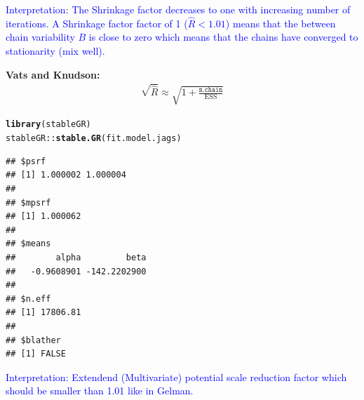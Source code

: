 \documentclass{article}\usepackage[]{graphicx}\usepackage[]{xcolor}
\makeatletter
\newcommand{\hlopt}[1]{\textcolor[rgb]{0,0,0}{#1}}%
\newcommand{\hlstd}[1]{\textcolor[rgb]{0.345,0.345,0.345}{#1}}%
\newcommand{\hlkwd}[1]{\textcolor[rgb]{0.737,0.353,0.396}{\textbf{#1}}}%
\newenvironment{kframe}{%
 \def\at@end@of@kframe{}%
 \ifinner\ifhmode%
  \def\at@end@of@kframe{\end{minipage}}%
  \begin{minipage}{\columnwidth}%
 \fi\fi%
 \def\FrameCommand##1{\hskip\@totalleftmargin \hskip-\fboxsep
 \colorbox{shadecolor}{##1}\hskip-\fboxsep
     \hskip-\linewidth \hskip-\@totalleftmargin \hskip\columnwidth}%
 \MakeFramed {\advance\hsize-\width
   \@totalleftmargin\z@ \linewidth\hsize
   \@setminipage}}%
 {\par\unskip\endMakeFramed%
 \at@end@of@kframe}
\newenvironment{knitrout}{}{} %
\makeatother
\begin{document}
\begin{multicols*}{2}
\begin{knitrout}
\end{knitrout}
\footnotesize
\textcolor{blue}{Interpretation: The Shrinkage factor decreases to one with increasing number of iterations. A Shrinkage factor factor of 1 ($\hat{R}<1.01$) means that the between chain variability $B$ is close to zero which means that the chains have converged to stationarity (mix well).}

\textbf{Vats and Knudson:}
\begin{align*}
\sqrt{\hat{R}}\approx\sqrt{1+\frac{\texttt{n.chain}}{\text{ESS}}}
\end{align*}
\tiny
\begin{knitrout}
\color{fgcolor}\begin{kframe}
\begin{alltt}
\hlkwd{library}\hlstd{(stableGR)}
\hlstd{stableGR}\hlopt{::}\hlkwd{stable.GR}\hlstd{(fit.model.jags)}
\end{alltt}
\begin{verbatim}
## $psrf
## [1] 1.000002 1.000004
## 
## $mpsrf
## [1] 1.000062
## 
## $means
##        alpha         beta 
##   -0.9608901 -142.2202900 
## 
## $n.eff
## [1] 17806.81
## 
## $blather
## [1] FALSE
\end{verbatim}
\end{kframe}
\end{knitrout}
\footnotesize

\textcolor{blue}{Interpretation: Extendend (Multivariate) potential scale reduction factor which should be smaller than 1.01 like in Gelman.}



\end{multicols*}
\end{document}
